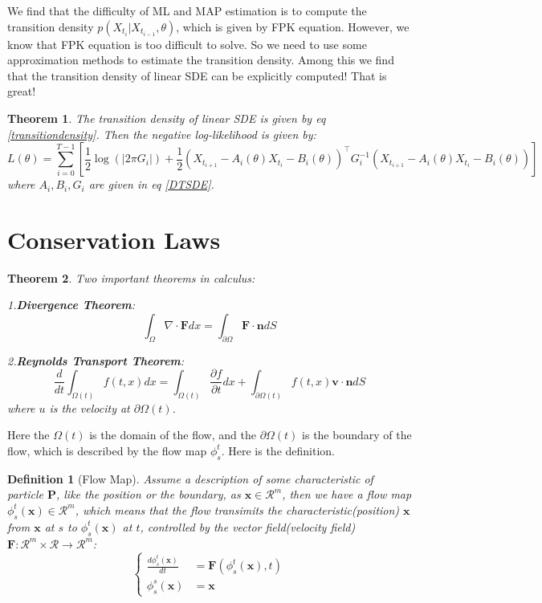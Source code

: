 \documentclass{article}
\newtheorem{theorem}{Theorem}
\newtheorem{definition}{Definition}
\begin{document}
We find that the difficulty of ML and MAP estimation is to compute the transition density $p(X_{t_i}|X_{t_{i-1}}, \theta)$, which is given by FPK equation. 
However, we know that FPK equation is too difficult to solve. So we need to use some approximation methods to estimate the transition density.
Among this we find that the transition density of linear SDE can be explicitly computed! That is great!
\begin{theorem}
    The transition density of linear SDE is given by eq \ref{transitiondensity}. Then the negative log-likelihood is given by:
    \begin{equation}
        L(\theta) = \sum_{i=0}^{T - 1} \left[\frac{1}{2}\log(|2\pi G_i|)+\frac{1}{2}(X_{t_{i+1}} - A_i(\theta)X_{t_i} - B_i(\theta))^\top G_i^{-1}(X_{t_{i+1}} - A_i(\theta)X_{t_i} - B_i(\theta))\right]
    \end{equation}
    where $A_i, B_i, G_i$ are given in eq \ref{DTSDE}.
\end{theorem}

\section{Conservation Laws}
\begin{theorem}Two important theorems in calculus:

    1.\textbf{Divergence Theorem}:
    \begin{equation}
        \int_{\Omega} \nabla \cdot \mathbf{F} d x = \int_{\partial \Omega} \mathbf{F} \cdot \mathbf{n} d S
    \end{equation}

    2.\textbf{Reynolds Transport Theorem}:
    \begin{equation}
        \frac{d}{dt}\int_{\Omega(t)} f(t, x) d x = \int_{\Omega (t)} \frac{\partial f}{\partial t} d x + \int_{\partial \Omega (t)} f(t, x) \mathbf{v} \cdot \mathbf{n} d S
    \end{equation}
    where $u$ is the velocity at $\partial \Omega (t)$.
\end{theorem}
Here the $\Omega(t)$ is the domain of the flow, and the $\partial \Omega(t)$ is the boundary of the flow, which is described by the flow map $\phi_s^t$. Here is the definition.
\begin{definition}[Flow Map]
    Assume a description of some characteristic of particle $\mathbf{P}$, like the position or the boundary, as $\mathbf{x}\in \mathcal{R}^m$, then we have a flow map $\phi_s^t(\mathbf{x})\in \mathcal{R}^m$, 
    which means that the flow transimits the characteristic(position) $\mathbf{x}$ from $\mathbf{x}$ at $s$ to $\phi_s^t(\mathbf{x})$ at $t$, controlled by the vector field(velocity field) $\mathbf{F}: \mathcal{R}^m\times \mathcal{R}\to \mathcal{R}^m$:
    \begin{equation}\left\{
        \begin{aligned}
            \frac{d\phi_s^t(\mathbf{x})}{dt} &= \mathbf{F}(\phi_s^t(\mathbf{x}), t)\\
            \phi_s^s(\mathbf{x}) &= \mathbf{x}
        \end{aligned}\right.
    \end{equation}
\end{definition}
\end{document}
